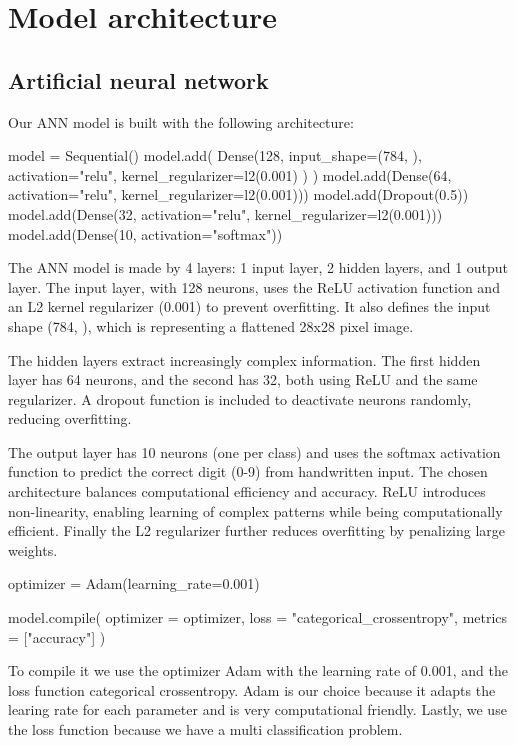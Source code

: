 \section{Model architecture}

\subsection{Artificial neural network}
Our ANN model is built with the following architecture:
\begin{python}
model = Sequential()
model.add( 
         Dense(128, 
               input_shape=(784, ),
               activation="relu", 
               kernel_regularizer=l2(0.001)
               )
          )
model.add(Dense(64, activation="relu", kernel_regularizer=l2(0.001)))
model.add(Dropout(0.5))
model.add(Dense(32, activation="relu", kernel_regularizer=l2(0.001)))
model.add(Dense(10, activation="softmax"))
\end{python}
The ANN model is made by 4 layers: 1 input layer, 2 hidden layers, and 1 output layer. 
The input layer, with 128 neurons, uses the ReLU activation function and an L2 kernel regularizer (0.001) to prevent overfitting.
It also defines the input shape (784, ), which is representing a flattened 28x28 pixel image.
\par
The hidden layers extract increasingly complex information. 
The first hidden layer has 64 neurons, and the second has 32, both using ReLU and the same regularizer. 
A dropout function is included to deactivate neurons randomly, reducing overfitting.
\par
The output layer has 10 neurons (one per class) and uses the softmax activation function to predict the correct digit (0-9) from handwritten input.
The chosen architecture balances computational efficiency and accuracy. ReLU introduces non-linearity, enabling learning of complex patterns while being computationally efficient. 
Finally the L2 regularizer further reduces overfitting by penalizing large weights.

\begin{python}
optimizer = Adam(learning_rate=0.001)

model.compile(
    optimizer = optimizer, 
    loss = "categorical_crossentropy", 
    metrics = ["accuracy"]
)
\end{python}
To compile it we use the optimizer Adam with the learning rate of 0.001, and the loss function categorical crossentropy.
Adam is our choice because it adapts the learing rate for each parameter and is very computational friendly.
Lastly, we use the loss function because we have a multi classification problem.

